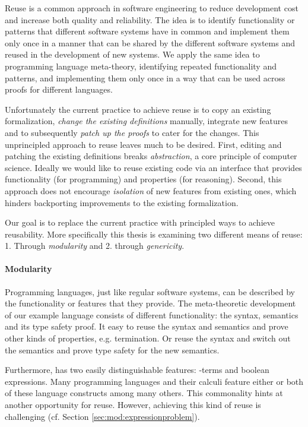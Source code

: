 {Reuse is a common approach in software engineering to reduce development cost
and increase both quality and reliability. The idea is to identify functionality
or patterns that different software systems have in common and implement them
only once in a manner that can be shared by the different software systems and
reused in the development of new systems. We apply the same idea to programming
language meta-theory, identifying repeated functionality and patterns, and
implementing them only once in a way that can be used across proofs for
different languages.

Unfortunately the current practice to achieve reuse is to copy an existing
formalization, \emph{change the existing definitions} manually, integrate new
features and to subsequently \emph{patch up the proofs} to cater for the
changes. This unprincipled approach to reuse leaves much to be desired. First,
editing and patching the existing definitions breaks \emph{abstraction}, a core
principle of computer science. Ideally we would like to reuse existing code via
an interface that provides functionality (for programming) and properties (for
reasoning). Second, this approach does not encourage \emph{isolation} of new
features from existing ones, which hinders backporting improvements to the
existing formalization.

Our goal is to replace the current practice with principled ways to achieve
reusability. More specifically this thesis is examining two different means of
reuse: 1. Through \emph{modularity} and 2. through \emph{genericity}.

\paragraph{Modularity}
Programming languages, just like regular software systems, can be described by
the functionality or features that they provide. The meta-theoretic development
of our example language \stlcbool consists of different functionality: the
syntax, semantics and its type safety proof. It easy to reuse the syntax and
semantics and prove other kinds of properties, e.g. termination. Or reuse the
syntax and switch out the semantics and prove type safety for the new semantics.

Furthermore, \stlcbool has two easily distinguishable features:
\textlambda-terms and boolean expressions. Many programming languages and their
calculi feature either or both of these language constructs among many others.
This commonality hints at another opportunity for reuse. However, achieving this
kind of reuse is challenging (cf. Section \ref{sec:mod:expressionproblem}).

}
